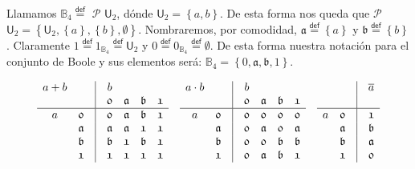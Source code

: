 \documentclass[final,12pt,a4paper,twoside,fleqn]{extbook}
\newcommand{\mathdef}{\ensuremath{\stackrel{\mathsf{def}}{{}={}}}}
\newcommand{\set}[1]{\ensuremath{\left\lbrace{#1}\right\rbrace}}
\newcommand{\setB}{\ensuremath{\mathbb{B}}}
\theoremstyle{definition}
\theoremstyle{remark}
\begin{document}
	Llamamos \( \setB_4 \mathdef \) \large \( \mathscr{P} \) \normalsize \( 
\mathsf{U}_2 \), dónde \( \mathsf{U}_2 = \set{a,b} \). De esta forma nos 
queda que \large \( \mathscr{P} \) \normalsize \( \mathsf{U}_2 = \set{ 
\mathsf{U}_2, \set{a}, \set{b}, \emptyset} \). Nombraremos, por comodidad, \( 
\mathfrak{a} \mathdef \set{a} \) y \( \mathfrak{b} \mathdef \set{b} \).
Claramente \( \mathfrak{1} \mathdef 1_{\setB_4} \mathdef \mathsf{U}_2 \) y \(
\mathfrak{0} \mathdef 0_{\setB_4} \mathdef \emptyset \). De esta forma
nuestra notación para el conjunto de Boole y sus elementos será: \(\setB_4 =
\set{\mathfrak{0},\mathfrak{a},\mathfrak{b},\mathfrak{1}}\).



\begin{equation}
  \begin{matrix}
   a + b & {} & \vline & b & {} \\
   {} & {} & \vline & \mathfrak{0} & \mathfrak{a} & \mathfrak{b} & \mathfrak{1} \\
    \hline
   {a} & \mathfrak{0} & \vline  &  \mathfrak{0} & \mathfrak{a} & \mathfrak{b} & \mathfrak{1} \\
   {}  & \mathfrak{a} & \vline  &  \mathfrak{a} & \mathfrak{a} & \mathfrak{1} & \mathfrak{1} \\
   {}  & \mathfrak{b} & \vline  &  \mathfrak{b} & \mathfrak{1} & \mathfrak{b} & \mathfrak{1} \\
   {}  & \mathfrak{1} & \vline  &  \mathfrak{1} & \mathfrak{1} & \mathfrak{1} & \mathfrak{1} \\
  \end{matrix}
  \qquad
  \begin{matrix}
   a \cdot b & {}  & \vline & b & {} \\
   {} & {} &         \vline & \mathfrak{0} & \mathfrak{a} & \mathfrak{b} & \mathfrak{1} \\
   \hline
   {a} & \mathfrak{0} & \vline  &  \mathfrak{0} & \mathfrak{0} & \mathfrak{0} & \mathfrak{0} \\
   {}  & \mathfrak{a} & \vline  &  \mathfrak{0} & \mathfrak{a} & \mathfrak{0} & \mathfrak{a} \\
   {}  & \mathfrak{b} & \vline  &  \mathfrak{0} & \mathfrak{0} & \mathfrak{b} & \mathfrak{b} \\
   {}  & \mathfrak{1} & \vline  &  \mathfrak{0} & \mathfrak{a} & \mathfrak{b} & \mathfrak{1} \\
  \end{matrix}
  \qquad
  \begin{matrix}
    {}  & {} & \vline & {\overline a} \\
    {}  & {} & \vline & {} \\
    \hline
    {a} & \mathfrak{0} & \vline &  \mathfrak{1} \\
    {}  & \mathfrak{a} & \vline &  \mathfrak{b} \\
    {}  & \mathfrak{b} & \vline &  \mathfrak{a} \\
    {}  & \mathfrak{1} & \vline &  \mathfrak{0} \\
  \end{matrix}
\end{equation}
\end{document}
